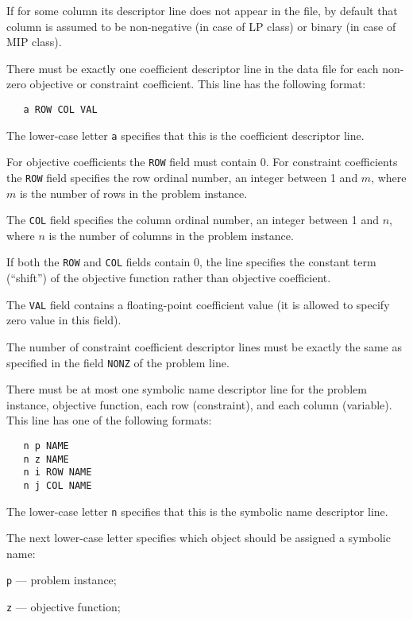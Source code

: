 If for some column its descriptor line does not appear in the file, by
default that column is assumed to be non-negative (in case of LP class)
or binary (in case of MIP class).

 There must be exactly one coefficient
descriptor line in the data file for each non-zero objective or
constraint coefficient. This line has the following format:

\begin{verbatim}
   a ROW COL VAL
\end{verbatim}

The lower-case letter \verb|a| specifies that this is the coefficient
descriptor line.

For objective coefficients the \verb|ROW| field must contain 0. For
constraint coefficients the \verb|ROW| field specifies the row ordinal
number, an integer between 1 and $m$, where $m$ is the number of rows
in the problem instance.

The \verb|COL| field specifies the column ordinal number, an integer
between 1 and $n$, where $n$ is the number of columns in the problem
instance.

If both the \verb|ROW| and \verb|COL| fields contain 0, the line
specifies the constant term (``shift'') of the objective function
rather than objective coefficient.

The \verb|VAL| field contains a floating-point coefficient value (it is
allowed to specify zero value in this field).

The number of constraint coefficient descriptor lines must be exactly
the same as specified in the field \verb|NONZ| of the problem line.

 There must be at most one symbolic
name descriptor line for the problem instance, objective function, each
row (constraint), and each column (variable). This line has one of the
following formats:

\begin{verbatim}
   n p NAME
   n z NAME
   n i ROW NAME
   n j COL NAME
\end{verbatim}

The lower-case letter \verb|n| specifies that this is the symbolic name
descriptor line.

The next lower-case letter specifies which object should be assigned a
symbolic name:

\verb|p| --- problem instance;

\verb|z| --- objective function;

